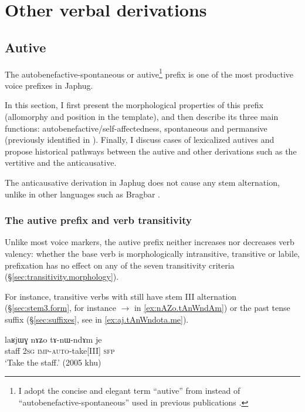 \chapter{Other verbal derivations} \label{chap:other.derivations}
 
\section{Autive} \label{sec:autobenefactive} 
The autobenefactive-spontaneous or autive\footnote{I adopt the concise and elegant term ``autive'' from \citet{gong18these} instead of ``autobenefactive-spontaneous'' used in previous publications \citep{jacques15spontaneous}. } prefix  is one of the most productive voice prefixes in Japhug. 

In this section, I first present the morphological properties of this prefix (allomorphy and position in the template), and then describe its three main functions: autobenefactive/self-affectedness, spontaneous and permansive (previously identified in \citealt{jacques15spontaneous}). Finally, I discuss cases of lexicalized autives and propose historical pathways between the autive and other derivations such as the vertitive and the anticausative.

The anticausative derivation in Japhug does not cause any stem alternation, unlike in other languages such as Bragbar \citep{zhangshuya20these}.
 
\subsection{The autive prefix and verb transitivity}  \label{sec:autoben.transitivity}
Unlike most voice markers, the autive prefix  neither increases nor decreases verb valency: whether the base verb is morphologically intransitive, transitive or labile,  prefixation has no effect on any of the seven transitivity criteria (§\ref{sec:transitivity.morphology}).

For instance, transitive verbs with  still have stem III alternation (§\ref{sec:stem3.form}, for instance  $\rightarrow$  in \ref{ex:nAZo.tAnWndAm}) or the past tense  suffix (§\ref{sec:suffixes}, see  in \ref{ex:aj.tAnWndota.me}).

 \begin{exe}
\ex \label{ex:nAZo.tAnWndAm}
\gll laʁjɯɣ nɤʑo tɤ-nɯ-ndɤm je  \\
staff \textsc{2sg} \textsc{imp}-\textsc{auto}-take[III] \textsc{sfp} \\
\glt `Take the staff.' (2005 khu) 
\end{exe}

